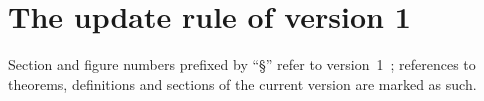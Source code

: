 
%
  {}{}
\providecommand{\RefEOneCountsShort}{\textbf{??}}
\providecommand{\RefEOneCountSeven}{\textbf{??}}
\providecommand{\RefEOneFailSeven}{\textbf{??}}
\providecommand{\RefEOneVOnePad}{\textbf{??}}
\providecommand{\RefEOneVOneRhoMax}{\textbf{??}}
\providecommand{\RefEOneVOneRowOrders}{\textbf{??}}
\providecommand{\RefETwoCycleRho}{\textbf{??}}
\providecommand{\RefETwoTorusRho}{\textbf{??}}

\section{The update rule of version 1}\label{sec:v1-rule}

Section and figure numbers prefixed by ``\S'' refer to version~1~\cite{ouyang2025mmhm_v1};
references to theorems, definitions and sections of the current version are
marked as such.

